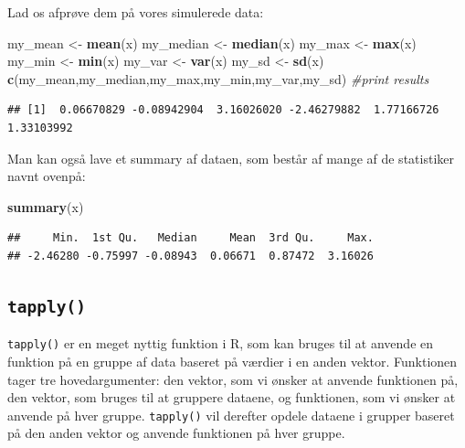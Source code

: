 \documentclass[
]{book}
\newenvironment{Shaded}{\begin{snugshade}}{\end{snugshade}}
\newcommand{\CommentTok}[1]{\textcolor[rgb]{0.56,0.35,0.01}{\textit{#1}}}
\newcommand{\FunctionTok}[1]{\textcolor[rgb]{0.13,0.29,0.53}{\textbf{#1}}}
\newcommand{\NormalTok}[1]{#1}
\newcommand{\OtherTok}[1]{\textcolor[rgb]{0.56,0.35,0.01}{#1}}
\begin{document}
Lad os afprøve dem på vores simulerede data:

\begin{Shaded}
\begin{Highlighting}[]
\NormalTok{my\_mean }\OtherTok{\textless{}{-}} \FunctionTok{mean}\NormalTok{(x)}
\NormalTok{my\_median }\OtherTok{\textless{}{-}} \FunctionTok{median}\NormalTok{(x)}
\NormalTok{my\_max }\OtherTok{\textless{}{-}} \FunctionTok{max}\NormalTok{(x)}
\NormalTok{my\_min }\OtherTok{\textless{}{-}} \FunctionTok{min}\NormalTok{(x)}
\NormalTok{my\_var }\OtherTok{\textless{}{-}} \FunctionTok{var}\NormalTok{(x)}
\NormalTok{my\_sd }\OtherTok{\textless{}{-}} \FunctionTok{sd}\NormalTok{(x)}
\FunctionTok{c}\NormalTok{(my\_mean,my\_median,my\_max,my\_min,my\_var,my\_sd) }\CommentTok{\#print results}
\end{Highlighting}
\end{Shaded}

\begin{verbatim}
## [1]  0.06670829 -0.08942904  3.16026020 -2.46279882  1.77166726  1.33103992
\end{verbatim}

Man kan også lave et summary af dataen, som består af mange af de statistiker navnt ovenpå:

\begin{Shaded}
\begin{Highlighting}[]
\FunctionTok{summary}\NormalTok{(x)}
\end{Highlighting}
\end{Shaded}

\begin{verbatim}
##     Min.  1st Qu.   Median     Mean  3rd Qu.     Max. 
## -2.46280 -0.75997 -0.08943  0.06671  0.87472  3.16026
\end{verbatim}

\subsection{\texorpdfstring{\texttt{tapply()}}{tapply()}}\label{tapply}

\texttt{tapply()} er en meget nyttig funktion i R, som kan bruges til at anvende en funktion på en gruppe af data baseret på værdier i en anden vektor. Funktionen tager tre hovedargumenter: den vektor, som vi ønsker at anvende funktionen på, den vektor, som bruges til at gruppere dataene, og funktionen, som vi ønsker at anvende på hver gruppe. \texttt{tapply()} vil derefter opdele dataene i grupper baseret på den anden vektor og anvende funktionen på hver gruppe.
\end{document}
